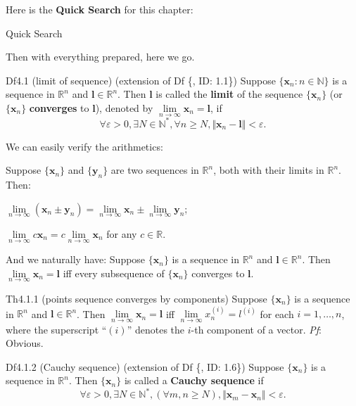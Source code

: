 \documentclass{article}
\begin{document}
Here is the \textbf{Quick Search} for this chapter:
\begin{Th}{Quick Search}
\end{Th}

Then with everything prepared, here we go.

\begin{Df}{Df4.1 (limit of sequence) (extension of Df \{, ID: 1.1\})}
    Suppose $\{\pmb{x}_n: n\in\mathbb{N}\}$ is a sequence in $\mathbb{R}^n$ and $\pmb{l}\in\mathbb{R}^n$. Then $\pmb{l}$ is called the \textbf{limit} of the sequence $\{\pmb{x}_n\}$ (or $\{\pmb{x}_n\}$ \textbf{converges} to $\pmb{l}$), denoted by $\lim\limits_{n\to\infty} \pmb{x}_n = \pmb{l}$, if
    $$\forall \varepsilon > 0, \exists N\in\mathbb{N}^\ast, \forall n\geq N, \Vert \pmb{x}_n - \pmb{l}\Vert < \varepsilon.$$
\end{Df}

\begin{Rmk}{}
    We can easily verify the arithmetics:
    \textcolor{Th}{Suppose $\{\pmb{x}_n\}$ and $\{\pmb{y}_n\}$ are two sequences in $\mathbb{R}^n$, both with their limits in $\mathbb{R}^n$. Then:
    \begin{compactenum}
        \item $\lim\limits_{n\to\infty} (\pmb{x}_n\pm\pmb{y}_n) = \lim\limits_{n\to\infty} \pmb{x}_n \pm \lim\limits_{n\to\infty} \pmb{y}_n$;
        \item $\lim\limits_{n\to\infty} c\pmb{x}_n = c\lim\limits_{n\to\infty} \pmb{x}_n$ for any $c\in\mathbb{R}$.
    \end{compactenum}}
    And we naturally have:
    \textcolor{Th}{Suppose $\{\pmb{x}_n\}$ is a sequence in $\mathbb{R}^n$ and $\pmb{l}\in\mathbb{R}^n$. Then $\lim\limits_{n\to\infty} \pmb{x}_n = \pmb{l}$ iff every subsequence of $\{\pmb{x}_n\}$ converges to $\pmb{l}$.}
\end{Rmk}

\begin{Th}{Th4.1.1 (points sequence converges by components)}
    Suppose $\{\pmb{x}_n\}$ is a sequence in $\mathbb{R}^n$ and $\pmb{l}\in\mathbb{R}^n$. Then $\lim\limits_{n\to\infty} \pmb{x}_n = \pmb{l}$ iff $\lim\limits_{n\to\infty} x^{(i)}_n = l^{(i)}$ for each $i = 1, \dots, n$, where the superscript ``$(i)$'' denotes the $i$-th component of a vector.
    \tcblower
    \textit{Pf}: Obvious.
\end{Th}

\begin{Df}{Df4.1.2 (Cauchy sequence) (extension of Df \{, ID: 1.6\})}
    Suppose $\{\pmb{x}_n\}$ is a sequence in $\mathbb{R}^n$. Then $\{\pmb{x}_n\}$ is called a \textbf{Cauchy sequence} if
    $$\forall \varepsilon > 0, \exists N\in\mathbb{N}^\ast, \left(\forall m,n\geq N\right), \Vert \pmb{x}_m - \pmb{x}_n\Vert < \varepsilon.$$
\end{Df}
\end{document}
